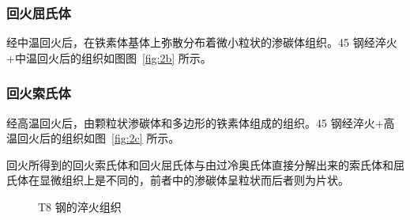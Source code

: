 \documentclass[a4paper,utf8]{article}
\newcommand{\fgref}[1]{图~\ref{#1}\xspace}
\begin{document}
            \subsubsection{回火屈氏体}
                经中温回火后，在铁素体基体上弥散分布着微小粒状的渗碳体组织。45 钢经淬火+中温回火后的组织如图\fgref{fig:2b} 所示。
            \subsubsection{回火索氏体}
                经高温回火后，由颗粒状渗碳体和多边形的铁素体组成的组织。45 钢经淬火+高温回火后的组织如\fgref{fig:2c} 所示。\par
                回火所得到的回火索氏体和回火屈氏体与由过冷奥氏体直接分解出来的索氏体和屈氏体在显微组织上是不同的，前者中的渗碳体呈粒状而后者则为片状。
                \begin{figure}[!ht]
                    \centering
                    \hspace{20pt}
                    \hspace{20pt}
                    \caption{T8 钢的淬火组织\label{fig:3}}
                \end{figure}
\end{document}
